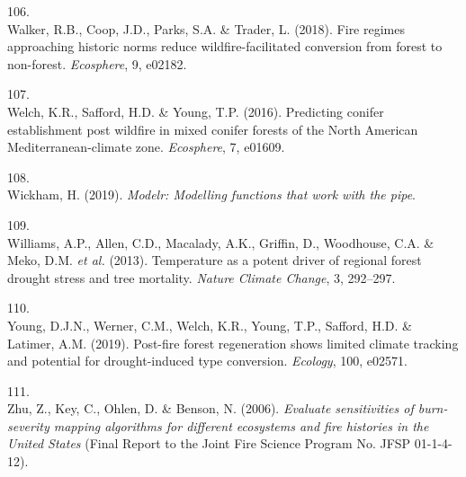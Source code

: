 \documentclass[]{article}
\begin{document}
\leavevmode\hypertarget{ref-walker2018}{}%
106.\\
Walker, R.B., Coop, J.D., Parks, S.A. \& Trader, L. (2018). Fire regimes
approaching historic norms reduce wildfire-facilitated conversion from
forest to non-forest. \emph{Ecosphere}, 9, e02182.

\leavevmode\hypertarget{ref-welch2016}{}%
107.\\
Welch, K.R., Safford, H.D. \& Young, T.P. (2016). Predicting conifer
establishment post wildfire in mixed conifer forests of the North
American Mediterranean-climate zone. \emph{Ecosphere}, 7, e01609.

\leavevmode\hypertarget{ref-wickham2019}{}%
108.\\
Wickham, H. (2019). \emph{Modelr: Modelling functions that work with the
pipe}.

\leavevmode\hypertarget{ref-parkwilliams2013}{}%
109.\\
Williams, A.P., Allen, C.D., Macalady, A.K., Griffin, D., Woodhouse,
C.A. \& Meko, D.M. \emph{et al.} (2013). Temperature as a potent driver
of regional forest drought stress and tree mortality. \emph{Nature
Climate Change}, 3, 292--297.

\leavevmode\hypertarget{ref-young2019}{}%
110.\\
Young, D.J.N., Werner, C.M., Welch, K.R., Young, T.P., Safford, H.D. \&
Latimer, A.M. (2019). Post-fire forest regeneration shows limited
climate tracking and potential for drought-induced type conversion.
\emph{Ecology}, 100, e02571.

\leavevmode\hypertarget{ref-zhu2006}{}%
111.\\
Zhu, Z., Key, C., Ohlen, D. \& Benson, N. (2006). \emph{Evaluate
sensitivities of burn-severity mapping algorithms for different
ecosystems and fire histories in the United States} (Final Report to the
Joint Fire Science Program No. JFSP 01-1-4-12).
\end{document}
